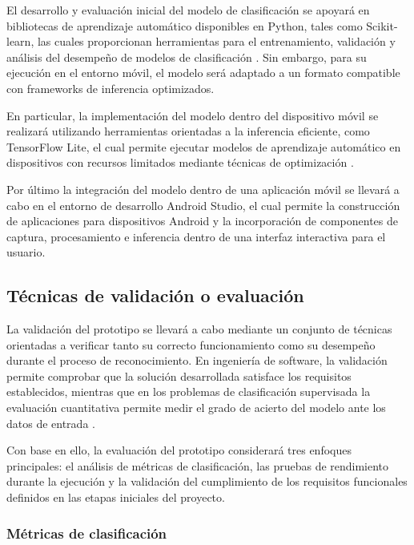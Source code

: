 	El desarrollo y evaluación inicial del modelo de clasificación se apoyará en
	bibliotecas de aprendizaje automático disponibles en Python, tales como
	Scikit-learn, las cuales proporcionan herramientas para el entrenamiento,
	validación y análisis del desempeño de modelos de clasificación
	\cite{scikit-learn}. Sin embargo, para su ejecución en el entorno móvil, el
	modelo será adaptado a un formato compatible con frameworks de inferencia
	optimizados.
	
	En particular, la implementación del modelo dentro del dispositivo móvil se
	realizará utilizando herramientas orientadas a la inferencia eficiente, como
	TensorFlow Lite, el cual permite ejecutar modelos de aprendizaje automático
	en dispositivos con recursos limitados mediante técnicas de optimización
	\cite{tensorflow_lite}.
	
	Por último la integración del modelo dentro de una aplicación móvil se
	llevará a cabo en el entorno de desarrollo Android Studio, el cual permite la
	construcción de aplicaciones para dispositivos Android y la incorporación de
	componentes de captura, procesamiento e inferencia dentro de una interfaz
	interactiva para el usuario.
	
	\subsection{Técnicas de validación o evaluación}
	
	La validación del prototipo se llevará a cabo mediante un conjunto de técnicas
	orientadas a verificar tanto su correcto funcionamiento como su desempeño
	durante el proceso de reconocimiento. En ingeniería de software, la validación
	permite comprobar que la solución desarrollada satisface los requisitos
	establecidos, mientras que en los problemas de clasificación supervisada la
	evaluación cuantitativa permite medir el grado de acierto del modelo ante los
	datos de entrada \cite{pressman2014,sommerville2016,bishop2006}.
	
	Con base en ello, la evaluación del prototipo considerará tres enfoques
	principales: el análisis de métricas de clasificación, las pruebas de
	rendimiento durante la ejecución y la validación del cumplimiento de los
	requisitos funcionales definidos en las etapas iniciales del proyecto.
	
	\subsubsection{Métricas de clasificación}
	
